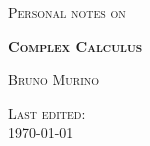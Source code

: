 \begin{titlepage}
    \begin{center}
        \vspace*{2cm}
        
        \Large
        \textsc{Personal notes on}
        
        
        \vspace{1cm}
        \Huge
        \textsc{ \textbf{Complex Calculus}}
        
        \vspace{1cm}
        \Large
        \textsc{ Bruno Murino}
        
        \vfill
        
        \textsc{ Last edited:}\\
        \textsc{ \today}
        
    \end{center}
\end{titlepage}